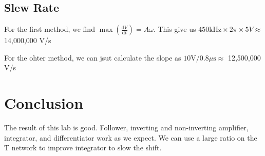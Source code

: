 \documentclass[aps,prl,reprint]{revtex4-1}
\newcommand{\de}{\mathrm{d}}
\begin{document}
    \subsection{Slew Rate}
        For the first method, we find $\max\left(\frac{\de V}{\de t}\right) = A \omega$. This give us $450\text{kHz}\times 2 \pi \times 5 V \approx$ 14,000,000 V/s

        For the ohter method, we can jsut calculate the slope as $10\text{V} / 0.8\mu\text{s} \approx$  12,500,000 V/s

\section{Conclusion}
    The result of this lab is good. Follower, inverting and non-inverting amplifier, integrator, and differentiator work as we expect. We can use a large ratio on the T network to improve integrator to slow the shift.











\end{document}
